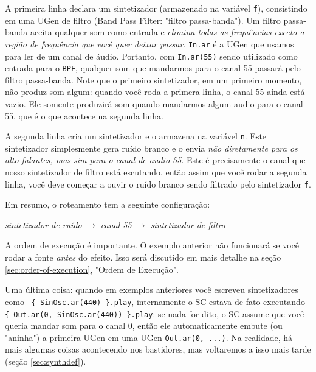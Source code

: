 A primeira linha declara um sintetizador (armazenado na variável \texttt{f}), consistindo em uma UGen de filtro (Band Pass Filter: "filtro passa-banda"). Um filtro passa-banda aceita qualquer som como entrada e \emph{elimina todas as frequências exceto a região de frequência que você quer deixar passar}. \texttt{In.ar} é a UGen que usamos para ler de um canal de áudio. Portanto, com \texttt{In.ar(55)} sendo utilizado como entrada para o \texttt{BPF}, qualquer som que mandarmos para o canal 55 passará pelo filtro passa-banda. Note que o primeiro sintetizador, em um primeiro momento, não produz som algum: quando você roda a primera linha, o canal 55 ainda está vazio. Ele somente produzirá som quando mandarmos algum audio para o canal 55, que é o que acontece na segunda linha.

A segunda linha cria um sintetizador e o armazena na variável \texttt{n}. Este sintetizador simplesmente gera ruído branco e o envia \emph{não diretamente para os alto-falantes, mas sim para o canal de audio 55}. Este é precisamente o canal que nosso sintetizador de filtro está escutando, então assim que você rodar a segunda linha, você deve começar a ouvir o ruído branco sendo filtrado pelo sintetizador \texttt{f}.

Em resumo, o roteamento tem a seguinte configuração: 

\begin{center}
\emph{sintetizador de ruído} $\rightarrow$ \emph{canal 55} $\rightarrow$ \emph{sintetizador de filtro}
\end{center}

A ordem de execução é importante. O exemplo anterior não funcionará se você rodar a fonte \emph{antes} do efeito. Isso será discutido em mais detalhe na seção \ref{sec:order-of-execution}, "Ordem de Execução".

Uma última coisa: quando em exemplos anteriores você escreveu sintetizadores como \texttt{ \{ SinOsc.ar(440) \}.play}, internamente o SC estava de fato executando \texttt{\{ Out.ar(0, SinOsc.ar(440)) \}.play}: se nada for dito, o SC assume que você queria mandar som para o canal 0, então ele automaticamente embute (ou "aninha") a primeira UGen em uma UGen \texttt{Out.ar(0, ...)}. Na realidade, há mais algumas coisas acontecendo nos bastidores, mas voltaremos a isso mais tarde (seção \ref{sec:synthdef}).
